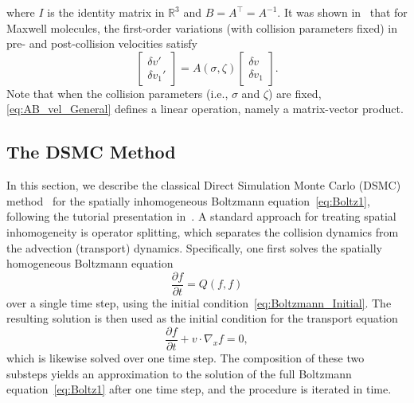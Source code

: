 \documentclass[12pt,nopreprintline]{elsarticle}
\newcommand{\bbR}{\mathbb R} \newcommand{\bbS}{\mathbb S}
\newcommand{\Rthree}{{\bbR^3}}
\begin{document}
where $I$ is the identity matrix in $\Rthree$ and $B= A^\top = A^{-1}$. It was shown in~\cite{caflisch2021adjoint} that for Maxwell molecules, the first-order variations (with collision parameters fixed) in pre- and post-collision velocities satisfy
\begin{equation}\label{eq:fwd_perturb_General}
        \begin{bmatrix}
    \delta v'\\
    \delta v_1'
    \end{bmatrix}   =
    A(\sigma,\zeta)
 \begin{bmatrix}
    \delta  v\\
    \delta v_1
    \end{bmatrix}.
\end{equation}
Note that when the collision parameters (i.e., $\sigma$ and $\zeta$) are fixed, \eqref{eq:AB_vel_General} defines a linear operation, namely a matrix-vector product.

\subsection{The DSMC Method}\label{sec:intro_dsmc}

In this section, we describe the classical Direct Simulation Monte Carlo (DSMC) method~\cite{bird1970direct,nanbu1980direct,babovsky1986simulation,babovsky1989convergence} for the spatially inhomogeneous Boltzmann equation~\eqref{eq:Boltz1}, following the tutorial presentation in~\cite{pareschi2001introduction}. A standard approach for treating spatial inhomogeneity is operator splitting, which separates the collision dynamics from the advection (transport) dynamics. Specifically, one first solves the spatially homogeneous Boltzmann equation
\begin{equation}
\label{eq:homoBoltz}
\frac{\partial f}{\partial t} = Q(f,f)
\end{equation}
over a single time step, using the initial condition~\eqref{eq:Boltzmann_Initial}. The resulting solution is then used as the initial condition for the transport equation
\begin{equation}
\label{eq:transport}
\frac{\partial f}{\partial t} + v \cdot \nabla_x f = 0,
\end{equation}
which is likewise solved over one time step. The composition of these two substeps yields an approximation to the solution of the full Boltzmann equation~\eqref{eq:Boltz1} after one time step, and the procedure is iterated in time.
\end{document}
